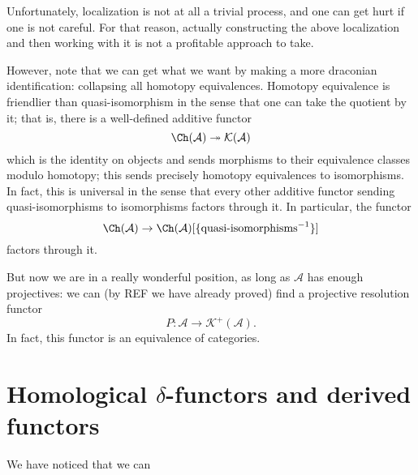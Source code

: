 \documentclass[main.tex]{subfiles}
\begin{document}
Unfortunately, localization is not at all a trivial process, and one can get hurt if one is not careful. For that reason, actually constructing the above localization and then working with it is not a profitable approach to take.

However, note that we can get what we want by making a more draconian identification: collapsing all homotopy equivalences. Homotopy equivalence is friendlier than quasi-isomorphism in the sense that one can take the quotient by it; that is, there is a well-defined additive functor
\begin{equation*}
  \Ch(\mathcal{A}) \twoheadrightarrow \mathcal{K}(\mathcal{A})
\end{equation*}
which is the identity on objects and sends morphisms to their equivalence classes modulo homotopy; this sends precisely homotopy equivalences to isomorphisms. In fact, this is universal in the sense that every other additive functor sending quasi-isomorphisms to isomorphisms factors through it. In particular, the functor
\begin{equation*}
  \Ch(\mathcal{A}) \to \Ch(\mathcal{A})[\{\text{quasi-isomorphisms}^{-1}\}]
\end{equation*}
factors through it.

But now we are in a really wonderful position, as long as $\mathcal{A}$ has enough projectives: we can (by REF we have already proved) find a projective resolution functor
\begin{equation*}
  P\colon \mathcal{A} \to \mathcal{K}^{+}(\mathcal{A}).
\end{equation*}
In fact, this functor is an equivalence of categories.

\section{Homological \texorpdfstring{$\delta$}{delta}-functors and derived functors}
\label{sec:homological_delta_functors}

We have noticed that we can
\end{document}
